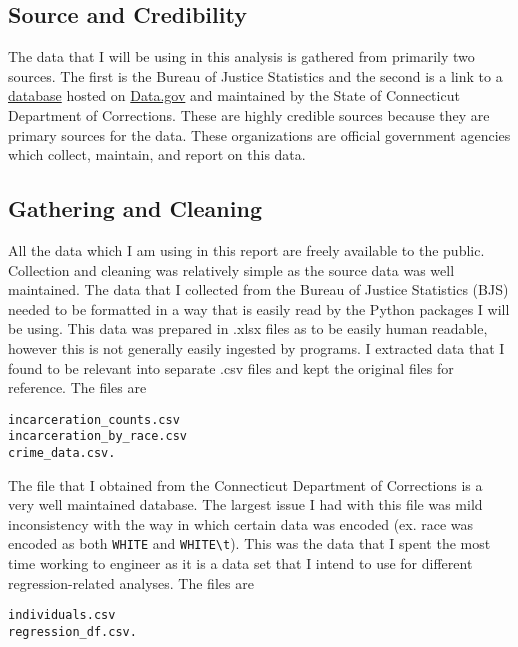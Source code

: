 \documentclass[11pt]{article}
\begin{document}
\hypertarget{source-and-credibility}{%
\subsection{Source and Credibility}\label{source-and-credibility}}

The data that I will be using in this analysis is gathered from
primarily two sources. The first is the Bureau of Justice Statistics and
the second is a link to a
\href{https://catalog.data.gov/dataset/sentenced-inmates-in-correctional-facilities}{database}
hosted on \href{https://www.data.gov}{Data.gov} and maintained by the
State of Connecticut Department of Corrections. These are highly
credible sources because they are primary sources for the data. These
organizations are official government agencies which collect, maintain,
and report on this data.

\hypertarget{gathering-and-cleaning}{%
\subsection{Gathering and Cleaning}\label{gathering-and-cleaning}}

All the data which I am using in this report are freely available to the
public. Collection and cleaning was relatively simple as the source data
was well maintained. The data that I collected from the Bureau of
Justice Statistics (BJS) needed to be formatted in a way that is easily
read by the Python packages I will be using. This data was prepared in
.xlsx files as to be easily human readable, however this is not
generally easily ingested by programs. I extracted data that I found to
be relevant into separate .csv files and kept the original files for
reference. The files are

\begin{verbatim}
incarceration_counts.csv
incarceration_by_race.csv
crime_data.csv.
\end{verbatim}

The file that I obtained from the Connecticut Department of Corrections
is a very well maintained database. The largest issue I had with this
file was mild inconsistency with the way in which certain data was
encoded (ex. race was encoded as both \texttt{WHITE} and
\texttt{WHITE\textbackslash{}t}). This was the data that I spent the
most time working to engineer as it is a data set that I intend to use
for different regression-related analyses. The files are

\begin{verbatim}
individuals.csv
regression_df.csv.
\end{verbatim}
\end{document}
